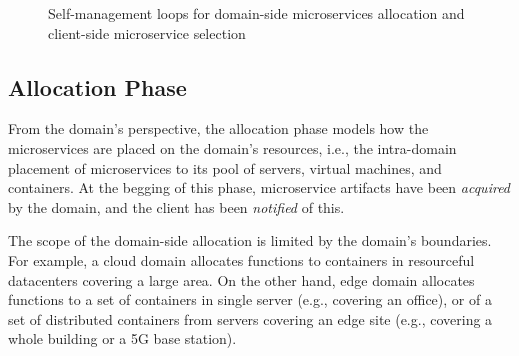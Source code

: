 \begin{figure}[thbp]
	\centering
	\captionsetup[subfigure]{width=0.4\textwidth}	
	\null\hfill
	\captionsetup[subfigure]{width=0.4\textwidth}	
	\hfill
	\hfill\null
	\caption{Self-management loops for domain-side microservices allocation and client-side microservice selection}\label{fig:allocation-loops}
\end{figure}

\subsection*{Allocation Phase}\label{sec:A3-E-allocation}

From the domain's perspective, the allocation phase models how the microservices are placed on the domain's resources, i.e., the intra-domain placement of microservices to its pool of servers, virtual machines, and containers. At the begging of this phase, microservice artifacts have been \textit{acquired} by the domain, and the client has been \textit{notified} of this.

The scope of the domain-side allocation is limited by the domain's boundaries. For example, a cloud domain allocates functions to containers in resourceful datacenters covering a large area. On the other hand, edge domain allocates functions to a set of containers in single server (e.g., covering an office), or of a set of distributed containers from servers covering an edge site (e.g., covering a whole building or a 5G base station).

